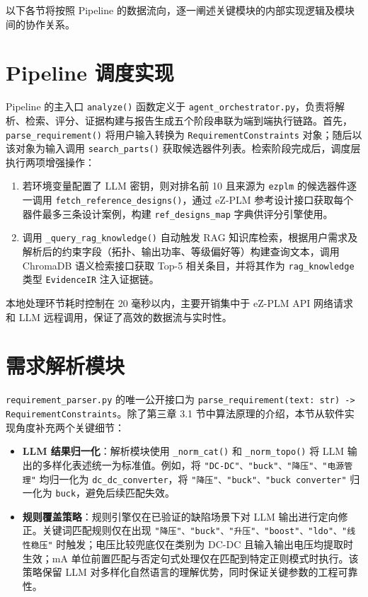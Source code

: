以下各节将按照 Pipeline 的数据流向，逐一阐述关键模块的内部实现逻辑及模块间的协作关系。
\section{Pipeline 调度实现}

Pipeline 的主入口 \texttt{analyze()} 函数定义于 \texttt{agent\_orchestrator.py}，负责将解析、检索、评分、证据构建与报告生成五个阶段串联为端到端执行链路。首先，\texttt{parse\_requirement()} 将用户输入转换为 \texttt{RequirementConstraints} 对象；随后以该对象为输入调用 \texttt{search\_parts()} 获取候选器件列表。检索阶段完成后，调度层执行两项增强操作：  

\begin{enumerate}
\item 若环境变量配置了 LLM 密钥，则对排名前 10 且来源为 \texttt{ezplm} 的候选器件逐一调用 \texttt{fetch\_reference\_designs()}，通过 eZ-PLM 参考设计接口获取每个器件最多三条设计案例，构建 \texttt{ref\_designs\_map} 字典供评分引擎使用。
\item 调用 \texttt{\_query\_rag\_knowledge()} 自动触发 RAG 知识库检索，根据用户需求及解析后的约束字段（拓扑、输出功率、等级偏好等）构建查询文本，调用 ChromaDB 语义检索接口获取 Top-5 相关条目，并将其作为 \texttt{rag\_knowledge} 类型 \texttt{EvidenceIR} 注入证据链。
\end{enumerate}

本地处理环节耗时控制在 20 毫秒以内，主要开销集中于 eZ-PLM API 网络请求和 LLM 远程调用，保证了高效的数据流与实时性。

\section{需求解析模块}

\texttt{requirement\_parser.py} 的唯一公开接口为 \texttt{parse\_requirement(text: str) -> RequirementConstraints}。除了第三章 3.1 节中算法原理的介绍，本节从软件实现角度补充两个关键细节：

\begin{itemize}
\item \textbf{LLM 结果归一化}：解析模块使用 \texttt{\_norm\_cat()} 和 \texttt{\_norm\_topo()} 将 LLM 输出的多样化表述统一为标准值。例如，将 \texttt{"DC-DC"、"buck"、"降压"、"电源管理"} 均归一化为 \texttt{dc\_dc\_converter}，将 \texttt{"降压"、"buck"、"buck converter"} 归一化为 \texttt{buck}，避免后续匹配失效。
\item \textbf{规则覆盖策略}：规则引擎仅在已验证的缺陷场景下对 LLM 输出进行定向修正。关键词匹配规则仅在出现 \texttt{"降压"、"buck"、"升压"、"boost"、"ldo"、"线性稳压"} 时触发；电压比较兜底仅在类别为 DC-DC 且输入输出电压均提取时生效；mA 单位前置匹配与否定句式处理仅在匹配到特定正则模式时执行。该策略保留 LLM 对多样化自然语言的理解优势，同时保证关键参数的工程可靠性。
\end{itemize}

